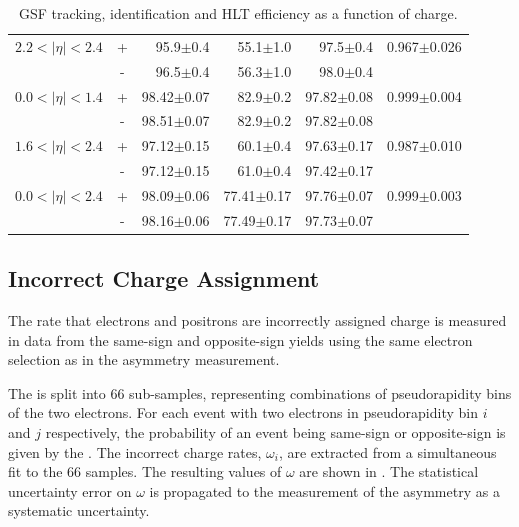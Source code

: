 \begin{table}[htbp]
\begin{center}
\begin{tabular}{lcrrrr}
$2.2<| \eta |<2.4$ &+& 95.9$\pm$0.4 &55.1$\pm$1.0 &97.5$\pm$0.4 & 0.967$\pm$0.026\\
                   &-& 96.5$\pm$0.4 &56.3$\pm$1.0 &98.0$\pm$0.4 & \\
\midrule
$0.0<| \eta |<1.4$ &+& 98.42$\pm$0.07 &82.9$\pm$0.2 &97.82$\pm$0.08 & 0.999$\pm$0.004\\
                   &-& 98.51$\pm$0.07 &82.9$\pm$0.2 &97.82$\pm$0.08 & \\
$1.6<| \eta |<2.4$ &+& 97.12$\pm$0.15 &60.1$\pm$0.4 &97.63$\pm$0.17 & 0.987$\pm$0.010\\
                   &-& 97.12$\pm$0.15 &61.0$\pm$0.4 &97.42$\pm$0.17 & \\
\midrule
$0.0<| \eta |<2.4$ &+& 98.09$\pm$0.06 &77.41$\pm$0.17 &97.76$\pm$0.07 & 0.999$\pm$0.003\\
                   &-& 98.16$\pm$0.06 &77.49$\pm$0.17 &97.73$\pm$0.07 & \\
\bottomrule
\end{tabular}
\end{center}
\caption{\label{tab:updatedefficiency} GSF tracking, identification and HLT efficiency as a function of charge\cite{bendavid2011electron}.}
\end{table}

\subsection{Incorrect Charge Assignment}
The rate that electrons and positrons are incorrectly assigned charge is measured
in data from the same-sign and opposite-sign \PZ yields using the same electron
selection as in the asymmetry measurement.

The \HepProcess{\PZ\to\Pe\Pe} is split into 66 sub-samples, representing
combinations of pseudorapidity bins of the two electrons.
For each \PZ event with two electrons in pseudorapidity bin $i$ and $j$
respectively, the probability of an event being same-sign or opposite-sign is
given by the . The incorrect charge rates,
$\omega_i$, are extracted from a simultaneous fit to the 66 samples.
The resulting values of $\omega$ are shown in . The
statistical uncertainty error on $\omega$ is propagated to the measurement of the
asymmetry as a systematic uncertainty.

